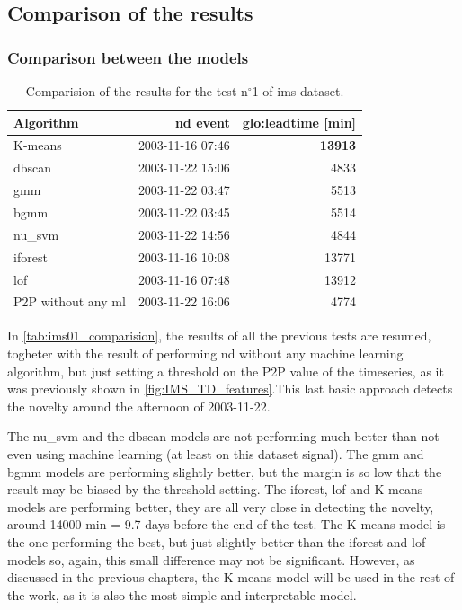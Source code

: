 \subsection{Comparison of the results}

\subsubsection{Comparison between the models}

\begin{table}
    \centering
    \caption{Comparision of the results for the test $\text{n}^\circ$1 of \gls{ims} dataset.}
    \label{tab:ims01_comparision}
    \begin{tabular}{lrr} 
    \toprule
    \textbf{Algorithm} & \textbf{\gls{nd} event} & \textbf{\gls{glo:leadtime} }{[}min] \\ 
    \hline
    K-means & 2003-11-16 07:46 & \textbf{13913} \\
    \gls{dbscan} & 2003-11-22 15:06 & 4833 \\
    \gls{gmm} & 2003-11-22 03:47 & 5513 \\
    \gls{bgmm} & 2003-11-22 03:45 & 5514 \\
    \gls{nu_svm} & 2003-11-22 14:56 & 4844 \\
    \gls{iforest} & 2003-11-16 10:08 & 13771 \\
    \gls{lof} & 2003-11-16 07:48 & 13912 \\
    {P2P} without any \gls{ml} & 2003-11-22 16:06 & 4774 \\
    \bottomrule
    \end{tabular}
\end{table}

In \autoref{tab:ims01_comparision}, the results of all the previous tests are resumed, togheter with the result of performing \gls{nd} without any machine learning algorithm, but just setting a threshold on the P2P value of the timeseries, as it was previously shown in \autoref{fig:IMS_TD_features}.This last basic approach detects the novelty around the afternoon of 2003-11-22. 

The \gls{nu_svm} and the \gls{dbscan} models are not performing much better than not even using machine learning (at least on this dataset signal). The \gls{gmm} and \gls{bgmm} models are performing slightly better, but the margin is so low that the result may be biased by the threshold setting. The \gls{iforest}, \gls{lof} and K-means models are performing better, they are all very close in detecting the novelty, around 14000 min = 9.7 days before the end of the test. The K-means model is the one performing the best, but just slightly better than the \gls{iforest} and \gls{lof} models so, again, this small difference may not be significant. However, as discussed in the previous chapters, the K-means model will be used in the rest of the work, as it is also the most simple and interpretable model.


